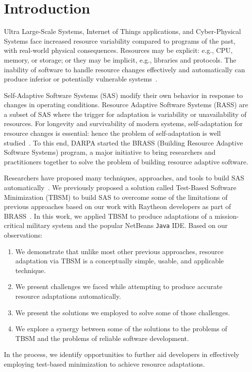 \section{Introduction}

Ultra Large-Scale Systems, Internet of Things applications, and Cyber-Physical Systems face increased resource variability compared to programs of the past, with real-world physical consequences.  Resources may be explicit: e.g., CPU, memory, or storage; or they may be implicit, e.g., libraries and protocols. The inability of software to handle resource changes effectively and automatically can produce inferior or potentially vulnerable systems~\cite{hughes2016building}. 

Self-Adaptive Software Systems (SAS) modify their own behavior in response to changes in operating conditions. Resource Adaptive Software Systems (RASS) are a subset of SAS where the trigger for adaptation is variability or unavailability of resources. For longevity and survivability of modern systems, self-adaptation for resource changes is essential: hence the problem of self-adaptation is well studied~\cite{seams2018keynote}. To this end, DARPA started the BRASS (Building Resource Adaptive Software Systems) program, a major initiative to bring researchers and practitioners together to solve the problem of building resource adaptive software. 

Researchers have proposed many techniques, approaches, and tools to build SAS automatically~\cite{hughes2016building,salehie2009selfadaptive,krupitzer2015a}. We previously proposed a solution called Test-Based Software Minimization (TBSM) to build SAS to overcome some of the limitations of previous approaches based on our work with Raytheon developers as part of BRASS~\cite{christi2017saso}. In this work, we applied TBSM to produce adaptations of a mission-critical military system and the popular NetBeans \texttt{Java} IDE.  Based on our observations: 
\begin{enumerate}
\item {We demonstrate that unlike most other previous approaches, resource adaptation via TBSM is a conceptually simple, usable, and applicable technique. }
\item {We present challenges we faced while attempting to produce accurate resource adaptations automatically. }
\item {We present the solutions we employed to solve some of those challenges. }
\item {We explore a synergy between some of the solutions to the problems of TBSM and the problems of reliable software development.}
\end{enumerate}

In the process, we identify opportunities to further aid developers in effectively employing test-based minimization to achieve resource adaptations. 





